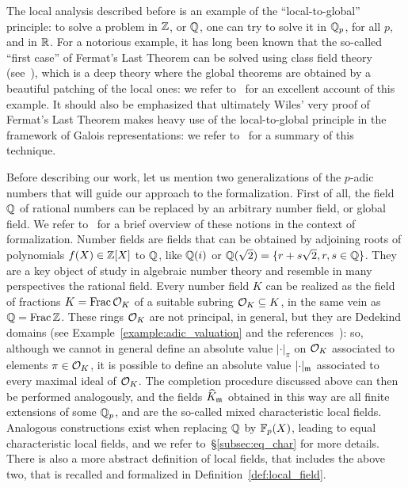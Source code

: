\documentclass[sigplan,10pt, nonacm, review]{acmart}
\begin{document}
The local analysis described before is an example of the ``local-to-global'' principle: to solve a problem in $\mathbb{Z}$, or $\mathbb{Q}$, one can try to solve it in $\mathbb{Q}_p$, for all $p$, and in $\mathbb{R}$. For a notorious example, it has long been known that the so-called ``first case'' of Fermat's Last Theorem can be solved using class field theory (see~\cite{LenSte97}), which is a deep theory where the global theorems are obtained by a beautiful patching of the local ones: we refer to \cite{Tat67}~for an excellent account of this example. It should also be emphasized that ultimately Wiles' very proof of Fermat's Last Theorem makes heavy use of the local-to-global principle in the framework of Galois representations: we refer to~\cite{Fre09} for a summary of this technique.

Before describing our work, let us mention two generalizations of the $p$-adic numbers that will guide our approach to the formalization. First of all, the field $\mathbb{Q}$ of rational numbers can be replaced by an arbitrary number field, or global field. We refer to~\cite[\S2]{BaaDahNarNuc22} for a brief overview of these notions in the context of formalization. Number fields are fields that can be obtained by adjoining roots of polynomials $f(X)\in\mathbb{Z}[X]$ to $\mathbb{Q}$, like $\mathbb{Q}(i)$ or $\mathbb{Q}(\sqrt{2})=\{r+s\sqrt{2}, r,s\in\mathbb{Q}\}$. They are a key object of study in algebraic number theory and resemble in many perspectives the rational field. Every number field $K$ can be realized as the field of fractions $K=\operatorname{Frac}{\mathcal{O}_{K}}$ of a suitable subring $\mathcal{O}_{K}\subseteq K$, in the same vein as $\mathbb{Q}=\operatorname{Frac}{\mathbb{Z}}$. These rings $\mathcal{O}_{K}$ are not principal, in general, but they are Dedekind domains (see Example~\ref{example:adic_valuation} and the references~\ibid): so, although we cannot in general define an absolute value $\lvert\cdot\rvert_\pi$ on $\mathcal{O}_{K}$ associated to elements $\pi\in\mathcal{O}_{K}$, it is possible to define an absolute value $\lvert\cdot\rvert_{\maxid[\empty]}$ associated to every maximal ideal of $\mathcal{O}_{K}$. The completion procedure discussed above can then be performed analogously, and the fields $\compl[{\maxid[\empty]}]{K}$ obtained in this way are all finite extensions of some $\mathbb{Q}_p$, and are the so-called mixed characteristic local fields. Analogous constructions exist when replacing $\mathbb{Q}$ by $\mathbb{F}_{p}(X)$, leading to equal characteristic local fields, and we refer to~\S\ref{subsec:eq_char} for more details. There is also a more abstract definition of local fields, that includes the above two, that is recalled and formalized in Definition~\ref{def:local_field}.
\end{document}
